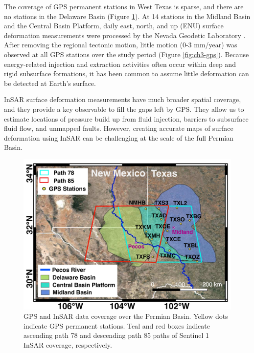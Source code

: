 The coverage of GPS permanent stations in West Texas is sparse, and there are no stations in the Delaware Basin (Figure \ref{fig:paper1-study-area}). At 14 stations in the Midland Basin and the Central Basin Platform, daily east, north, and up (ENU) surface deformation measurements were processed by the Nevada Geodetic Laboratory \citep{Blewitt2018HarnessingGpsData}. After removing the regional tectonic motion, little motion (0-3 mm/year) was observed at all GPS stations over the study period (Figure \ref{fig:ch3-gps}). Because energy-related injection and extraction activities often occur within deep and rigid subsurface formations, it has been common to assume little deformation can be detected at Earth's surface. 


InSAR surface deformation measurements have much broader spatial coverage, and they provide a key observable to fill the gaps left by GPS. They allow us to estimate locations of pressure build up from fluid injection, barriers to subsurface fluid flow, and unmapped faults. However, creating accurate maps of surface deformation using InSAR can be challenging at the scale of the full Permian Basin.

\begin{figure}
	\centering
	\includegraphics[width=0.9\linewidth]{figures/chapter4-grl/figure1-study-area.pdf}
	\caption[GPS and InSAR data coverage over the Permian Basin.]{GPS and InSAR data coverage over the Permian Basin. Yellow dots indicate GPS permanent stations. Teal and red boxes indicate ascending path 78 and descending path 85 paths of Sentinel 1 InSAR coverage, respectively. 
	}
	\label{fig:paper1-study-area}
\end{figure}

